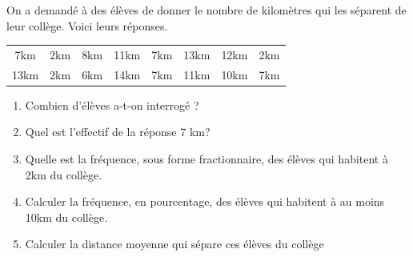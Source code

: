 \begin{exercicebox}
    On a demandé à des élèves de donner le nombre de kilomètres qui les séparent de leur
    collège.
    Voici leurs réponses.

    \begin{center}
    \begin{tabular}{cccccccc}
        7km  & 2km & 8km & 11km & 7km & 13km & 12km & 2km \\ 
        13km & 2km & 6km & 14km & 7km & 11km & 10km & 7km \\ 
    \end{tabular}
    \end{center}
   
    \begin{enumerate}
        \item Combien d'élèves a-t-on interrogé ?
        \item Quel est l'effectif de la réponse 7 km?
        \item Quelle est la fréquence, sous forme fractionnaire, des élèves qui
            habitent à 2km du
         collège.
        \item Calculer la fréquence, en pourcentage, des élèves qui habitent à
            au moins 10km du
        collège.
        \item Calculer la distance moyenne qui sépare ces élèves du collège
    \end{enumerate}
\end{exercicebox}
